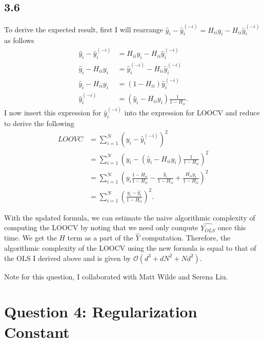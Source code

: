 \documentclass[12pt]{amsart}
\begin{document}
\subsection*{3.6}

To derive the expected result, first I will rearrange $\hat{y}_i - \hat{y}_i^{(-i)} = H_{ii}y_i - H_{ii}\hat{y}_i^{(-i)}$ as follows
\begin{equation}
\begin{split}
\hat{y}_i - \hat{y}_i^{(-i)} & = H_{ii}y_i - H_{ii}\hat{y}_i^{(-i)}  \\
\hat{y}_i - H_{ii}y_i & =  \hat{y}_i^{(-i)} - H_{ii}\hat{y}_i^{(-i)} \\
\hat{y}_i - H_{ii}y_i & =  (1 - H_{ii})\hat{y}_i^{(-i)} \\
\hat{y}_i^{(-i)} & = (\hat{y}_i - H_{ii}y_i) \frac{1}{1 - H_{ii}}.
\end{split}
\end{equation} 
I now insert this expression for $\hat{y}_i^{(-i)}$ into the expression for LOOCV and reduce to derive the following
\begin{equation}
\begin{split}
LOOVC & = \sum_{i = 1}^N (y_i - \hat{y}_i^{(-i)})^2 \\
& = \sum_{i = 1}^N \left( y_i -  (\hat{y}_i - H_{ii}y_i) \frac{1}{1 - H_{ii}} \right)^2 \\
& = \sum_{i = 1}^N \left( y_i\frac{1 - H_{ii}}{1 - H_{ii}} -  \frac{\hat{y}_i}{1 - H_{ii}}  + \frac{H_{ii}y_i}{1 - H_{ii}}  \right)^2 \\
& = \sum_{i = 1}^N \left( \frac{y_i - \hat{y_i}}{1 - H_{ii}} \right)^2.
\end{split}
\end{equation}

With the updated formula, we can estimate the naive algorithmic complexity of computing the LOOCV by noting that we need only compute $\hat{Y_{OLS}}$ once this time.  We get the $H$ term as a part of the $\hat{Y}$ computation.  Therefore, the algorithmic complexity of the LOOCV using the new formula is equal to that of the OLS I derived above and is given by $\mathcal{O}(d^3 + dN^2 + Nd^2)$.

Note for this question, I collaborated with Matt Wilde and Serena Liu.


\section*{Question 4: Regularization Constant}
\end{document}
